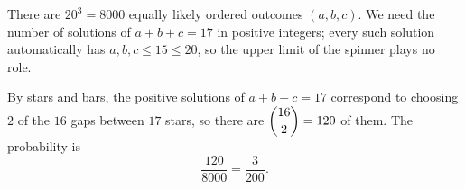 There are $20^3=8000$ equally likely ordered outcomes $(a,b,c)$. We need the number of solutions of $a+b+c=17$ in positive integers; every such solution automatically has $a,b,c\le15\le20$, so the upper limit of the spinner plays no role.

By stars and bars, the positive solutions of $a+b+c=17$ correspond to choosing $2$ of the $16$ gaps between $17$ stars, so there are $\dbinom{16}{2}=120$ of them. The probability is
\[
\dfrac{120}{8000}=\boxed{\dfrac{3}{200}}.
\]
